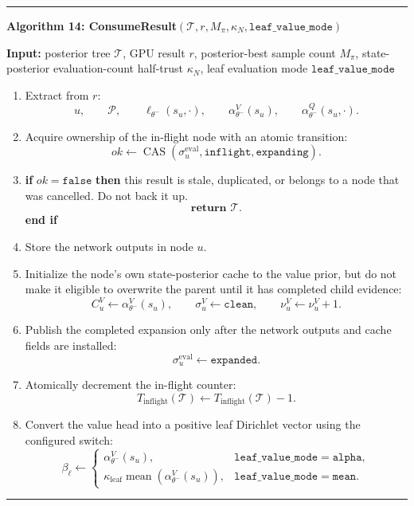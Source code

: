 \documentclass[11pt]{article}
\newcommand{\mean}{\operatorname{mean}}
\newcommand{\Tree}{\mathcal{T}}
\newcommand{\Path}{\mathcal{P}}
\newcommand{\CAS}{\operatorname{CAS}}
\newenvironment{algorithmblock}[1]
{
  \par\medskip
  \noindent\hrule\par\smallskip
  \noindent\textbf{#1}
  \par\smallskip
}
{
  \par\smallskip\noindent\hrule\par\medskip
}
\newcommand{\Input}{\textbf{Input: }}
\newcommand{\Return}{\textbf{return }}
\newcommand{\If}{\textbf{if }}
\newcommand{\Then}{\textbf{ then }}
\newcommand{\EndIf}{\textbf{end if}}
\begin{document}
\begin{algorithmblock}{Algorithm 14: ConsumeResult\((\Tree,r,M_\pi,\kappa_N,\texttt{leaf\_value\_mode})\)}

\Input posterior tree \(\Tree\), GPU result \(r\), posterior-best sample count \(M_\pi\), state-posterior evaluation-count half-trust \(\kappa_N\), leaf evaluation mode \(\texttt{leaf\_value\_mode}\)

\begin{enumerate}[leftmargin=2em]
  \item Extract from \(r\):
  \[
  u,
  \qquad
  \Path,
  \qquad
  \ell_{\theta^-}(s_u,\cdot),
  \qquad
  \alpha_{\theta^-}^V(s_u),
  \qquad
  \alpha_{\theta^-}^Q(s_u,\cdot).
  \]

  \item Acquire ownership of the in-flight node with an atomic transition:
  \[
  ok\gets
  \CAS
  \left(
  \sigma^{\mathrm{eval}}_u,
  \texttt{inflight},
  \texttt{expanding}
  \right).
  \]

  \item \If \(ok=\texttt{false}\) \Then
  this result is stale, duplicated, or belongs to a node that was cancelled. Do
  not back it up.
  \[
  \Return \Tree.
  \]
  \EndIf

  \item Store the network outputs in node \(u\).

  \item Initialize the node's own state-posterior cache to the value prior, but
  do not make it eligible to overwrite the parent until it has completed child
  evidence:
  \[
  C^V_u\gets\alpha_{\theta^-}^V(s_u),
  \qquad
  \sigma^V_u\gets\texttt{clean},
  \qquad
  \nu^V_u\gets\nu^V_u+1.
  \]

  \item Publish the completed expansion only after the network outputs and cache
  fields are installed:
  \[
  \sigma^{\mathrm{eval}}_u\gets\texttt{expanded}.
  \]

  \item Atomically decrement the in-flight counter:
  \[
  T_{\mathrm{inflight}}(\Tree)
  \gets
  T_{\mathrm{inflight}}(\Tree)-1.
  \]

  \item Convert the value head into a positive leaf Dirichlet vector using the
  configured switch:
  \[
  \beta_\ell
  \gets
  \begin{cases}
  \alpha_{\theta^-}^V(s_u),
  & \texttt{leaf\_value\_mode}=\texttt{alpha},\\[4pt]
  \kappa_{\mathrm{leaf}}
  \mean\left(\alpha_{\theta^-}^V(s_u)\right),
  & \texttt{leaf\_value\_mode}=\texttt{mean}.
  \end{cases}
  \]



\end{enumerate}
\end{algorithmblock}
\end{document}

